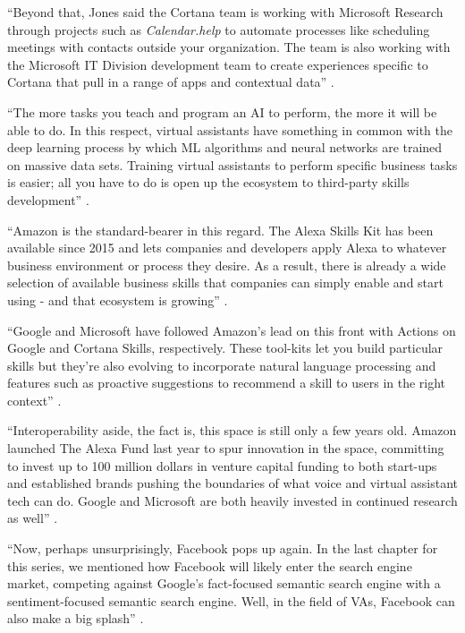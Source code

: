 ``Beyond that, Jones said the Cortana team is working with Microsoft Research through projects such as {\em Calendar.help} to automate processes like scheduling meetings with contacts outside your organization. The team is also working with the Microsoft IT Division development team to create experiences specific to Cortana that pull in a range of apps and contextual data'' \cite{Marvin2017them}.

``The more tasks you teach and program an AI to perform, the more it will be able to do. In this respect, virtual assistants have something in common with the deep learning process by which ML algorithms and neural networks are trained on massive data sets. Training virtual assistants to perform specific business tasks is easier; all you have to do is open up the ecosystem to third-party skills development'' \cite{Marvin2017them}.

``Amazon is the standard-bearer in this regard. The Alexa Skills Kit has been available since 2015 and lets companies and developers apply Alexa to whatever business environment or process they desire. As a result, there is already a wide selection of available business skills that companies can simply enable and start using - and that ecosystem is growing'' \cite{Marvin2017them}.

``Google and Microsoft have followed Amazon's lead on this front with Actions on Google and Cortana Skills, respectively. These tool-kits let you build particular skills but they're also evolving to incorporate natural language processing and features such as proactive suggestions to recommend a skill to users in the right context'' \cite{Marvin2017them}.

``Interoperability aside, the fact is, this space is still only a few years old. Amazon launched The Alexa Fund last year to spur innovation in the space, committing to invest up to 100 million dollars in venture capital funding to both start-ups and established brands pushing the boundaries of what voice and virtual assistant tech can do. Google and Microsoft are both heavily invested in continued research as well'' \cite{Marvin2017them}.

``Now, perhaps unsurprisingly, Facebook pops up again. In the last chapter for this series, we mentioned how Facebook will likely enter the search engine market, competing against Google’s fact-focused semantic search engine with a sentiment-focused semantic search engine. Well, in the field of VAs, Facebook can also make a big splash'' \cite{Tal2015internet}.

